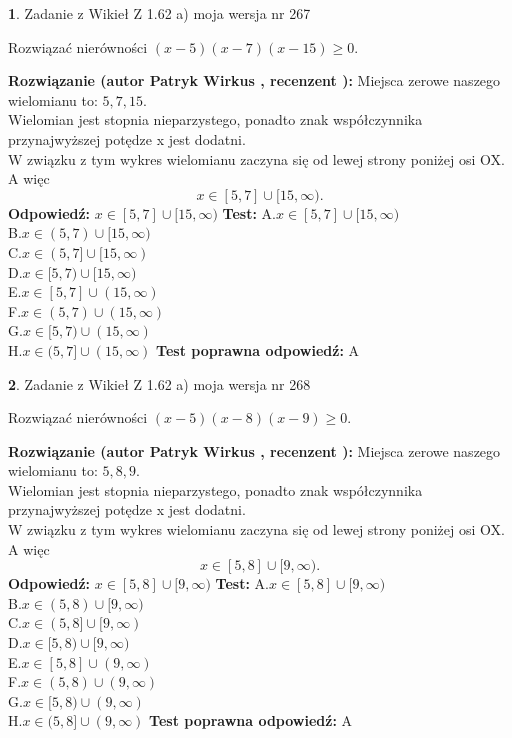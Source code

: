 \documentclass[12pt, a4paper]{article}
\theoremstyle{definition} %
\newtheorem{zad}{}
\newcommand{\zadStart}[1]{\begin{zad}#1\newline}
\newcommand{\zadStop}{\end{zad}}
\newcommand{\rozwStart}[2]{\noindent \textbf{Rozwiązanie (autor #1 , recenzent #2): }\newline}
\newcommand{\rozwStop}{\newline}
\newcommand{\odpStart}{\noindent \textbf{Odpowiedź:}\newline}
\newcommand{\odpStop}{\newline}
\newcommand{\testStart}{\noindent \textbf{Test:}\newline}
\newcommand{\testStop}{\newline}
\newcommand{\kluczStart}{\noindent \textbf{Test poprawna odpowiedź:}\newline}
\newcommand{\kluczStop}{\newline}
\begin{document}
\zadStart{Zadanie z Wikieł Z 1.62 a) moja wersja nr 267}

Rozwiązać nierówności $(x-5)(x-7)(x-15)\ge0$.
\zadStop
\rozwStart{Patryk Wirkus}{}
Miejsca zerowe naszego wielomianu to: $5, 7, 15$.\\
Wielomian jest stopnia nieparzystego, ponadto znak współczynnika przy\linebreak najwyższej potędze x jest dodatni.\\ W związku z tym wykres wielomianu zaczyna się od lewej strony poniżej osi OX. A więc $$x \in [5,7] \cup [15,\infty).$$
\rozwStop
\odpStart
$x \in [5,7] \cup [15,\infty)$
\odpStop
\testStart
A.$x \in [5,7] \cup [15,\infty)$\\
B.$x \in (5,7) \cup [15,\infty)$\\
C.$x \in (5,7] \cup [15,\infty)$\\
D.$x \in [5,7) \cup [15,\infty)$\\
E.$x \in [5,7] \cup (15,\infty)$\\
F.$x \in (5,7) \cup (15,\infty)$\\
G.$x \in [5,7) \cup (15,\infty)$\\
H.$x \in (5,7] \cup (15,\infty)$
\testStop
\kluczStart
A
\kluczStop



\zadStart{Zadanie z Wikieł Z 1.62 a) moja wersja nr 268}

Rozwiązać nierówności $(x-5)(x-8)(x-9)\ge0$.
\zadStop
\rozwStart{Patryk Wirkus}{}
Miejsca zerowe naszego wielomianu to: $5, 8, 9$.\\
Wielomian jest stopnia nieparzystego, ponadto znak współczynnika przy\linebreak najwyższej potędze x jest dodatni.\\ W związku z tym wykres wielomianu zaczyna się od lewej strony poniżej osi OX. A więc $$x \in [5,8] \cup [9,\infty).$$
\rozwStop
\odpStart
$x \in [5,8] \cup [9,\infty)$
\odpStop
\testStart
A.$x \in [5,8] \cup [9,\infty)$\\
B.$x \in (5,8) \cup [9,\infty)$\\
C.$x \in (5,8] \cup [9,\infty)$\\
D.$x \in [5,8) \cup [9,\infty)$\\
E.$x \in [5,8] \cup (9,\infty)$\\
F.$x \in (5,8) \cup (9,\infty)$\\
G.$x \in [5,8) \cup (9,\infty)$\\
H.$x \in (5,8] \cup (9,\infty)$
\testStop
\kluczStart
A
\kluczStop
\end{document}
